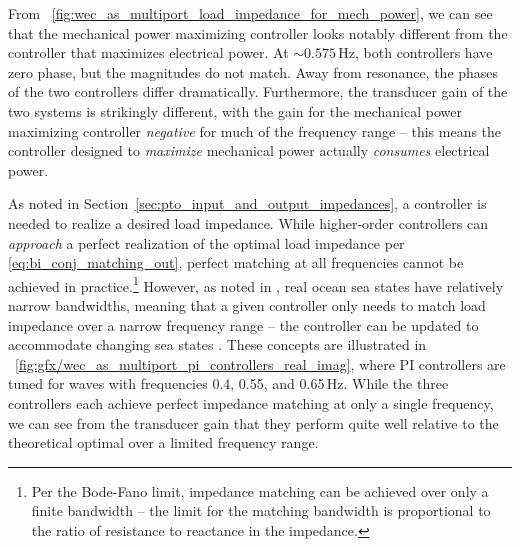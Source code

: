 \documentclass[lettersize,journal]{IEEEtran}
\begin{document}
%
From \figurename~\ref{fig:wec_as_multiport_load_impedance_for_mech_power}, we can see that the mechanical power maximizing controller looks notably different from the controller that maximizes electrical power.
At $\sim 0.575$\,Hz, both controllers have zero phase, but the magnitudes do not match.
Away from resonance, the phases of the two controllers differ dramatically.
Furthermore, the transducer gain of the two systems is strikingly different, with the gain for the mechanical power maximizing controller \emph{negative} for much of the frequency range -- this means the controller designed to \emph{maximize} mechanical power actually \emph{consumes} electrical power.

As noted in Section~\ref{sec:pto_input_and_output_impedances}, a controller is needed to realize a desired load impedance.
While higher-order controllers can \emph{approach} a perfect realization of the optimal load impedance per \eqref{eq:bi_conj_matching_out}, perfect matching at all frequencies cannot be achieved in practice.\footnote{Per the Bode-Fano limit, impedance matching can be achieved over only a finite bandwidth -- the limit for the matching bandwidth is proportional to the ratio of resistance to reactance in the impedance.}
However, as noted in \cite{Coe2020a}, real ocean sea states have relatively narrow bandwidths, meaning that a given controller only needs to match load impedance over a narrow frequency range -- the controller can be updated to accommodate changing sea states \cite{Forbush:2022aa}.
These concepts are illustrated in \figurename~\ref{fig:gfx/wec_as_multiport_pi_controllers_real_imag}, where PI controllers are tuned for waves with frequencies 0.4, 0.55, and 0.65\,Hz.
While the three controllers each achieve perfect impedance matching at only a single frequency, we can see from the transducer gain that they perform quite well relative to the theoretical optimal over a limited frequency range.
\end{document}
